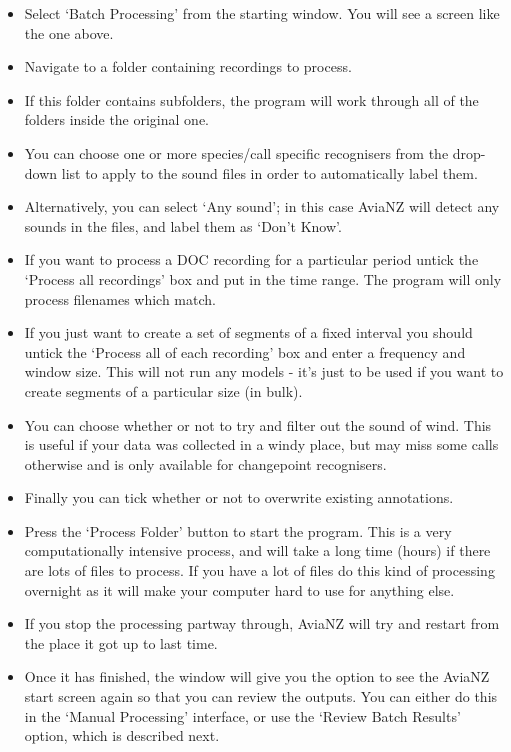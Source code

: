 \documentclass{article}
\begin{document}
\begin{itemize}
\item Select `Batch Processing' from the starting window. You will see a screen like the one above. 
\item Navigate to a folder containing recordings to process. 
\item If this folder contains subfolders, the program will work through all of the folders inside the original one. 
\item You can choose one or more species/call specific recognisers from the drop-down list to apply to the sound files in order to automatically label them. 
\item Alternatively, you can select `Any sound'; in this case AviaNZ will detect any sounds in the files, and label them as `Don't Know'. 
\item If you want to process a DOC recording for a particular period untick the `Process all recordings' box and put in the time range. The program will only process filenames which match.
\item If you just want to create a set of segments of a fixed interval you should untick the `Process all of each recording' box and enter a frequency and window size. This will not run any models - it's just to be used if you want to create segments of a particular size (in bulk).
\item You can choose whether or not to try and filter out the sound of wind. This is useful if your data was collected in a windy place, but may miss some calls otherwise and is only available for changepoint recognisers.
\item Finally you can tick whether or not to overwrite existing annotations.
\item Press the `Process Folder' button to start the program. This is a very computationally intensive process, and will take a long time (hours) if there are lots of files to process. If you have a lot of files do this kind of processing overnight as it will make your computer hard to use for anything else.
\item If you stop the processing partway through, AviaNZ will try and restart from the place it got up to last time.
\item Once it has finished, the window will give you the option to see the AviaNZ start screen again so that you can review the outputs. You can either do this in the `Manual Processing' interface, or use the `Review Batch Results' option, which is described next. 
\end{itemize}
\end{document}
